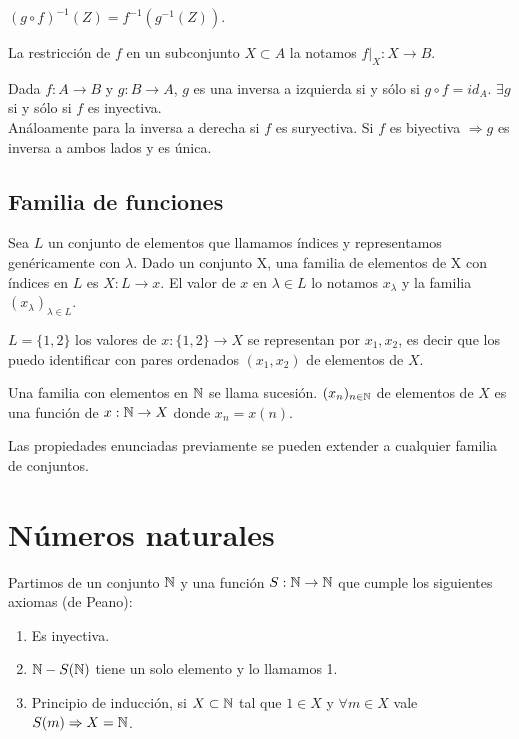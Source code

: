 \begin{prop}
    $(g \circ f)^{-1}(Z) = f^{-1}(g^{-1}(Z))$.
\end{prop}

\begin{definition}
    La restricción de $f$ en un subconjunto $X \subset A$ la notamos $f|_X: X \to B$.
\end{definition}

\begin{definition}
    Dada $f: A \to B$ y $g: B \to A$, $g$ es una inversa a izquierda si y sólo si $g \circ f = id_A$. $\exists g$ si y sólo si $f$ es inyectiva. \\
    Análoamente para la inversa a derecha si $f$ es suryectiva.
    Si $f$ es biyectiva $\Rightarrow g$ es inversa a ambos lados y es única.
\end{definition}

\subsection{Familia de funciones}

Sea $L$ un conjunto de elementos que llamamos índices y representamos genéricamente con $\lambda$. Dado un conjunto X, una familia de elementos de X con índices en $L$ es $X: L \to x$.
El valor de $x$ en $\lambda \in L$ lo notamos $x_\lambda$ y la familia $(x_\lambda)_{\lambda \in L}$.

\begin{eg}
    $L = \{ 1, 2 \}$ los valores de $x: \{1, 2\} \to X$ se representan por $x_1, x_2$, es decir que los puedo identificar con pares ordenados $(x_1, x_2)$ de elementos de $X$.
\end{eg}

Una familia con elementos en $\mathbb{N}$ se llama sucesión. $(x_n)_{n \in \mathbb{N}}$ de elementos de $X$ es una función de $x: \mathbb{N} \to X$ donde $x_n = x(n)$.

Las propiedades enunciadas previamente se pueden extender a cualquier familia de conjuntos.

\section{Números naturales}

Partimos de un conjunto $\mathbb{N}$ y una función $S: \mathbb{N} \to \mathbb{N}$ que cumple los siguientes axiomas (de Peano):
\begin{enumerate}
    \item Es inyectiva.
    \item $\mathbb{N} - S(\mathbb{N})$ tiene un solo elemento y lo llamamos 1.
    \item Principio de inducción, si $X \subset \mathbb{N}$ tal que $1 \in X$ y $\forall m \in X$ vale $S(m) \Rightarrow X = \mathbb{N}$.
\end{enumerate}

